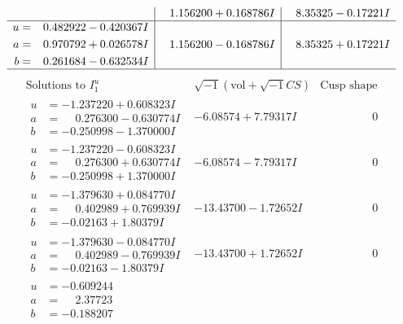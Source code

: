 \documentclass[1p]{elsarticle_modified}
\theoremstyle{definition}
\newcommand{\I}{\sqrt{-1}}
\begin{document}
$$\begin{array}{c|c|c}
 & \phantom{-}1.156200 + 0.168786 I & \phantom{-}8.35325 - 0.17221 I \\ \hline\begin{aligned}
u &= \phantom{-}0.482922 - 0.420367 I \\
a &= \phantom{-}0.970792 + 0.026578 I \\
b &= \phantom{-}0.261684 - 0.632534 I\end{aligned}
 & \phantom{-}1.156200 - 0.168786 I & \phantom{-}8.35325 + 0.17221 I\\
 \hline 
 \end{array}$$\newpage$$\begin{array}{c|c|c}  
\text{Solutions to }I^u_{1}& \I (\text{vol} + \sqrt{-1}CS) & \text{Cusp shape}\\
 \hline 
\begin{aligned}
u &= -1.237220 + 0.608323 I \\
a &= \phantom{-}0.276300 - 0.630774 I \\
b &= -0.250998 - 1.370000 I\end{aligned}
 & -6.08574 + 7.79317 I & \phantom{-0.000000 } 0 \\ \hline\begin{aligned}
u &= -1.237220 - 0.608323 I \\
a &= \phantom{-}0.276300 + 0.630774 I \\
b &= -0.250998 + 1.370000 I\end{aligned}
 & -6.08574 - 7.79317 I & \phantom{-0.000000 } 0 \\ \hline\begin{aligned}
u &= -1.379630 + 0.084770 I \\
a &= \phantom{-}0.402989 + 0.769939 I \\
b &= -0.02163 + 1.80379 I\end{aligned}
 & -13.43700 - 1.72652 I & \phantom{-0.000000 } 0 \\ \hline\begin{aligned}
u &= -1.379630 - 0.084770 I \\
a &= \phantom{-}0.402989 - 0.769939 I \\
b &= -0.02163 - 1.80379 I\end{aligned}
 & -13.43700 + 1.72652 I & \phantom{-0.000000 } 0 \\ \hline\begin{aligned}
u &= -0.609244\phantom{ +0.000000I} \\
a &= \phantom{-}2.37723\phantom{ +0.000000I} \\
b &= -0.188207\phantom{ +0.000000I}\end{aligned}

\end{array}$$
\end{document}
